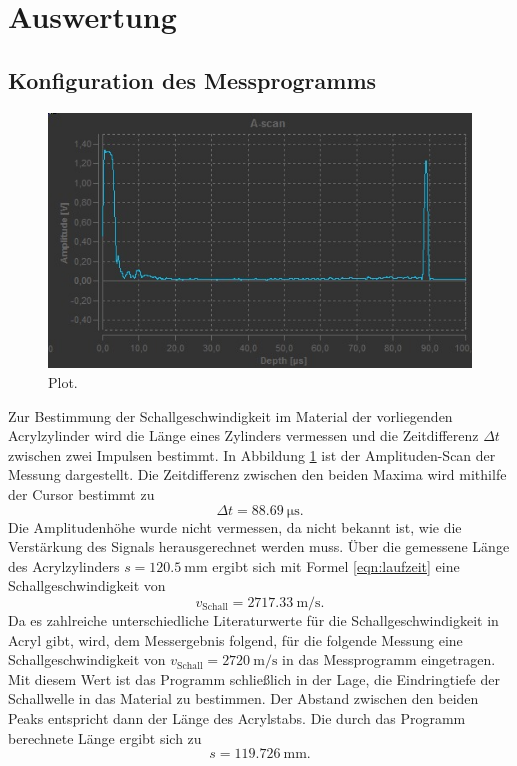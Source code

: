 \section{Auswertung}
\label{sec:Auswertung}

\subsection{Konfiguration des Messprogramms}
\begin{figure}
  \centering
  \includegraphics{Messdaten/a.jpg}
  \caption{Plot.}
  \label{fig:a1}
\end{figure}
Zur Bestimmung der Schallgeschwindigkeit im Material der vorliegenden Acrylzylinder wird die Länge eines Zylinders vermessen und die Zeitdifferenz $\Delta t$ zwischen zwei Impulsen bestimmt.
In Abbildung \ref{fig:a1} ist der Amplituden-Scan der Messung dargestellt.
Die Zeitdifferenz zwischen den beiden Maxima wird mithilfe der Cursor bestimmt zu
\begin{equation}
  \Delta t=\SI{88.69}{\micro\second} \text{.}
\end{equation}
Die Amplitudenhöhe wurde nicht vermessen, da nicht bekannt ist, wie die Verstärkung des Signals herausgerechnet werden muss.
Über die gemessene Länge des Acrylzylinders $s=\SI{120.5}{\milli\meter}$ ergibt sich mit Formel \eqref{eqn:laufzeit} eine Schallgeschwindigkeit von
\begin{equation}
  v_{\mathrm{Schall}}=\SI{2717.33}{\meter\per\second} \text{.}
\end{equation}
Da es zahlreiche unterschiedliche Literaturwerte für die Schallgeschwindigkeit in Acryl gibt, wird, dem Messergebnis folgend, für die folgende Messung eine Schallgeschwindigkeit von $v_{\mathrm{Schall}}=\SI{2720}{\meter\per\second}$ in das Messprogramm eingetragen.
Mit diesem Wert ist das Programm schließlich in der Lage, die Eindringtiefe der Schallwelle in das Material zu bestimmen.
Der Abstand zwischen den beiden Peaks entspricht dann der Länge des Acrylstabs.
Die durch das Programm berechnete Länge ergibt sich zu
\begin{equation}
  s=\SI{119.726}{\milli\meter} \text{.}
\end{equation}
\FloatBarrier

